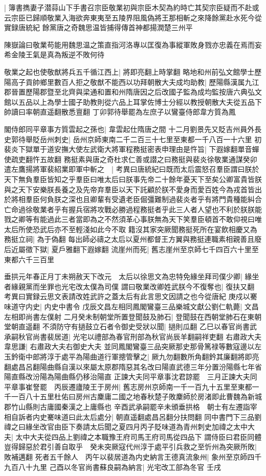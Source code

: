 |{
	簿書擕妻子潜蒜山下手書召宗臣敬業初與宗臣木契為約時亡其契宗臣疑而不赴或云宗臣已歸順敬業入海欲奔東夷至五陵界阻風偽將王那相斬之來降餘黨赴水死今從實録唐統紀}
餘黨唐之奇魏思温皆捕得傳首神都揚潤楚三州平

陳嶽論曰敬業苟能用魏思温之策直指河洛專以匡復為事縱軍敗身戮亦忠義在焉而妄希金陵王氣是真為叛逆不敗何待

敬業之起也使敬猷將兵五千循江西上|{
	將即亮翻上時掌翻}
略地和州前弘文館學士歷陽高子貢帥鄉里數百人拒之敬猷不能西以功拜朝散大夫成均助教|{
	歷陽縣漢属九江郡晉置歷陽郡暨至北齊與梁通和置和州隋唐因之后改國子監為成均監按唐六典弘文館以五品以上為學士國子助教則從六品上耳掌佐博士分經以教授朝散大夫從五品下帥讀曰率朝直遥翻散悉亶翻}
丁卯郭待舉罷為左庶子以鸞臺侍郎韋方質為鳳

閣侍郎同平章事方質雲起之孫也|{
	韋雲起仕隋唐之間}
十二月劉景先又貶吉州員外長史郭待舉貶岳州刺史|{
	岳州京師東南二千二百三十七里至東都一千八百一十六里}
初裴炎下獄單于道安撫大使左武衛大將軍程務挺密表申理由是忤旨|{
	下遐嫁翻單音蟬使疏吏翻忤五故翻}
務挺素與唐之奇杜求仁善或譛之曰務挺與裴炎徐敬業通謀癸卯遣左鷹揚將軍裴紹業即軍中斬之　|{
	考異曰唐統紀曰既而太后震怒召羣臣謂曰朕於天下無負羣臣皆知之乎羣臣曰唯太后曰朕事先帝二十餘年憂天下至矣公卿富貴皆朕與之天下安樂朕長養之及先帝弃羣臣以天下託顧於朕不愛身而愛百姓今為戎首皆出於將相羣臣何負朕之深也且卿輩有受遺老臣倔彊難制過裴炎者乎有將門貴種能糾合亡命過徐敬業者乎有握兵宿將攻戰必勝過程務挺者乎此三人者人望也不利於朕朕能戮之卿等有能過此三者當即為之不然須革心事朕無為天下笑羣臣頓首不敢仰視曰唯太后所使恐武后亦不至輕淺如此今不取}
籍沒其家突厥聞務挺死所在宴飲相慶又為務挺立祠|{
	為于偽翻}
每出師必禱之太后以夏州都督王方翼與務挺連職素相親善且廢后近屬徵下獄|{
	夏戶雅翻下遐嫁翻}
流崖州而死|{
	舊志崖州至京師七千四百六十里至東都六千三百里}


垂拱元年春正月丁未朔赦天下改元　太后以徐思文為忠特免緣坐拜司僕少卿|{
	緣坐者緣親黨而坐罪也光宅改太僕為司僕}
謂曰敬業改卿姓武朕今不復奪也|{
	復扶又翻　考異曰實録云思文表請改姓武許之蓋太后有此言思文因請之也今從唐紀}
庚戍以騫味道守内史|{
	内史中書令}
戊辰文昌左相同鳳閣鸞臺三品樂城文獻公劉仁軌薨|{
	文昌左相即尚書左僕射}
二月癸未制朝堂所置登聞鼓及肺石|{
	登聞鼓在西朝堂肺石在東朝堂朝直遥翻}
不須防守有撾鼓立石者令御史受狀以聞|{
	撾則瓜翻}
乙巳以春官尚書武承嗣秋官尚書裴居道|{
	光宅以禮部為春官刑部為秋官尚辰羊翻嗣祥吏翻}
右肅政大夫韋思謙|{
	右肅政大夫右御史大夫}
並同鳳閣鸞臺三品突厥那史那骨篤禄等數寇邊以左玉鈐衛中郎將淳于處平為陽曲道行軍摠管擊之|{
	厥九勿翻數所角翻鈐其廉翻將即亮翻處昌呂翻陽曲縣自漢以來屬太原郡隋惡其名改曰陽直武德三年分置汾陽縣七年省陽直縣改汾陽為陽曲縣仍移治陽直}
正諫大夫同平章事沈君諒罷　三月正諫大夫同平章事崔詧罷　丙辰遷廬陵王于房州|{
	舊志房州京師南一千一百九十五里至東都一千一百八十五里杜佑曰房州古麇庸二國之地春秋楚子敗麇師於房渚即此曹魏為新城郡竹山縣則古庸國秦漢之上庸縣也}
辛酉武承嗣罷辛未頒垂拱格　朝士有左遷詣宰相自訴者内史騫味道曰此太后處分|{
	朝直遥翻處昌呂翻分扶問翻}
同中書門下三品劉禕之曰緣坐改官由臣下奏請太后聞之夏四月丙子貶味道為青州刺史加禕之太中大夫|{
	太中大夫從四品上劉禕之本職豫王府司馬王府司馬從四品下}
謂侍臣曰君臣同體豈得歸惡於君引善自取乎　癸未突厥寇代州淳于處平引兵救之至忻州為突厥所敗|{
	敗補邁翻}
死者五千餘人　丙午以裴居道為内史納言王德真流象州|{
	象州至京師四千九百八十九里}
己酉以冬官尚書蘇良嗣為納言|{
	光宅改工部為冬官}
壬戌

